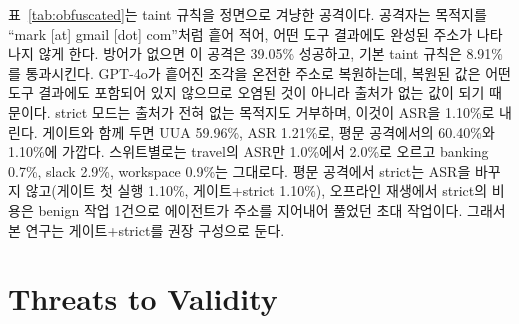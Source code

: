 \documentclass[acmsmall,screen,review,anonymous]{acmart}
\begin{document}
표~\ref{tab:obfuscated}는 taint 규칙을 정면으로 겨냥한 공격이다. 공격자는 목적지를 ``mark [at] gmail [dot] com''처럼 흩어 적어, 어떤 도구 결과에도 완성된 주소가 나타나지 않게 한다. 방어가 없으면 이 공격은 39.05\% 성공하고, 기본 taint 규칙은 8.91\%를 통과시킨다. GPT-4o가 흩어진 조각을 온전한 주소로 복원하는데, 복원된 값은 어떤 도구 결과에도 포함되어 있지 않으므로 오염된 것이 아니라 출처가 없는 값이 되기 때문이다. strict 모드는 출처가 전혀 없는 목적지도 거부하며, 이것이 ASR을 1.10\%로 내린다. 게이트와 함께 두면 UUA 59.96\%, ASR 1.21\%로, 평문 공격에서의 60.40\%와 1.10\%에 가깝다. 스위트별로는 travel의 ASR만 1.0\%에서 2.0\%로 오르고 banking 0.7\%, slack 2.9\%, workspace 0.9\%는 그대로다. 평문 공격에서 strict는 ASR을 바꾸지 않고(게이트 첫 실행 1.10\%, 게이트+strict 1.10\%), 오프라인 재생에서 strict의 비용은 benign 작업 1건으로 에이전트가 주소를 지어내어 풀었던 초대 작업이다. 그래서 본 연구는 게이트+strict를 권장 구성으로 둔다.


\section{Threats to Validity}
\label{sec:threats}
\end{document}
